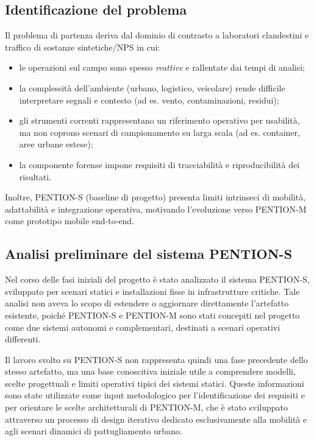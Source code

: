 \subsection{Identificazione del problema}
\label{subsec:problem_identification}

Il problema di partenza deriva dal dominio di contrasto a laboratori clandestini e traffico di sostanze sintetiche/NPS in cui:
\begin{itemize}
    \item le operazioni sul campo sono spesso \emph{reattive} e rallentate dai tempi di analisi;
    \item la complessità dell'ambiente (urbano, logistico, veicolare) rende difficile interpretare segnali e contesto (ad es. vento, contaminazioni, residui);
    \item gli strumenti correnti rappresentano un riferimento operativo per usabilità, ma non coprono scenari di campionamento su larga scala (ad es. container, aree urbane estese);
    \item la componente forense impone requisiti di tracciabilità e riproducibilità dei risultati.
\end{itemize}

Inoltre, PENTION-S (baseline di progetto) presenta limiti intrinseci di mobilità, adattabilità e integrazione operativa, motivando l'evoluzione verso PENTION-M come prototipo mobile end-to-end.

\subsection{Analisi preliminare del sistema PENTION-S}
\label{subsec:pention_s_analysis}

Nel corso delle fasi iniziali del progetto è stato analizzato il sistema \textsc{PENTION-S}, sviluppato per scenari statici e installazioni fisse in infrastrutture critiche.
Tale analisi non aveva lo scopo di estendere o aggiornare direttamente l’artefatto esistente, poiché \textsc{PENTION-S} e \textsc{PENTION-M} sono stati concepiti nel progetto come due sistemi autonomi e complementari, destinati a scenari operativi differenti.

Il lavoro svolto su \textsc{PENTION-S} non rappresenta quindi una fase precedente dello stesso artefatto, ma una base conoscitiva iniziale utile a comprendere modelli, scelte progettuali e limiti operativi tipici dei sistemi statici.
Queste informazioni sono state utilizzate come input metodologico per l’identificazione dei requisiti e per orientare le scelte architetturali di \textsc{PENTION-M}, che è stato sviluppato attraverso un processo di design iterativo dedicato esclusivamente alla mobilità e agli scenari dinamici di pattugliamento urbano.


